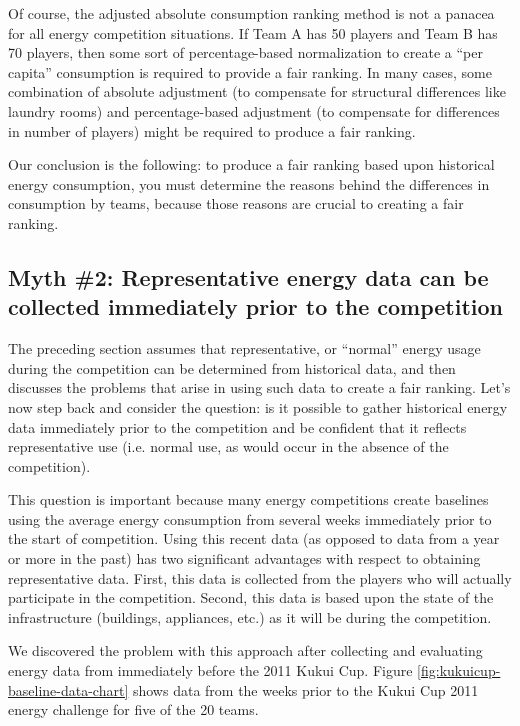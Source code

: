\documentclass[jou]{apa} %
\begin{document}
Of course, the adjusted absolute consumption ranking method is not a panacea for all
energy competition situations.  If Team A has 50 players and Team B has 70 players, then
some sort of percentage-based normalization to create a ``per capita'' consumption is
required to provide a fair ranking.  In many cases, some combination of absolute
adjustment (to compensate for structural differences like laundry rooms) and
percentage-based adjustment (to compensate for differences in number of players) might be
required to produce a fair ranking.

Our conclusion is the following: to produce a fair ranking based upon 
historical energy consumption, you must determine the reasons behind the differences in
consumption by teams, because those reasons are crucial to creating a fair ranking.

\subsection{Myth \#2: Representative energy data can be collected immediately prior to the competition}

The preceding section assumes that representative, or ``normal'' energy usage during the
competition can be determined from historical data, and then discusses the problems that
arise in using such data to create a fair ranking.  Let's now step back and consider the
question: is it possible to gather historical energy data immediately prior to the
competition and be confident that it reflects representative use (i.e. normal use, as
would occur in the absence of the competition). 

This question is important because many energy competitions create baselines using the
average energy consumption from several weeks immediately prior to the start of
competition.  Using this recent data (as opposed to data from a year or more in the past)
has two significant advantages with respect to obtaining representative data. First, this
data is collected from the players who will actually participate in the competition.
Second, this data is based upon the state of the infrastructure (buildings, appliances,
etc.) as it will be during the competition.

We discovered the problem with this approach after collecting and evaluating energy data
from immediately before the 2011 Kukui Cup. Figure
\ref{fig:kukuicup-baseline-data-chart} shows data from the weeks prior to the
Kukui Cup 2011 energy challenge for five of the 20 teams.
\end{document}
